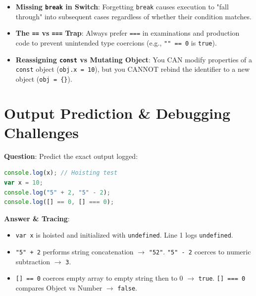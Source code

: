 \begin{examtip}
\begin{itemize}[leftmargin=1.5em]
    \item \textbf{Missing \texttt{break} in Switch}: Forgetting \texttt{break} causes execution to "fall through" into subsequent cases regardless of whether their condition matches.
    \item \textbf{The \texttt{==} vs \texttt{===} Trap}: Always prefer \texttt{===} in examinations and production code to prevent unintended type coercions (e.g., \texttt{"" == 0} is \texttt{true}).
    \item \textbf{Reassigning \texttt{const} vs Mutating Object}: You CAN modify properties of a \texttt{const} object (\texttt{obj.x = 10}), but you CANNOT rebind the identifier to a new object (\texttt{obj = \{\}}).
\end{itemize}
\end{examtip}

\section{Output Prediction \& Debugging Challenges}

\begin{outputprediction}
\textbf{Question}: Predict the exact output logged:
\begin{lstlisting}[language=JavaScript]
console.log(x); // Hoisting test
var x = 10;
console.log("5" + 2, "5" - 2);
console.log([] == 0, [] === 0);
\end{lstlisting}
\textbf{Answer \& Tracing}:
\begin{itemize}
    \item \texttt{var x} is hoisted and initialized with \texttt{undefined}. Line 1 logs \texttt{undefined}.
    \item \texttt{"5" + 2} performs string concatenation $\to$ \texttt{"52"}. \texttt{"5" - 2} coerces to numeric subtraction $\to$ \texttt{3}.
    \item \texttt{[] == 0} coerces empty array to empty string then to 0 $\to$ \texttt{true}. \texttt{[] === 0} compares Object vs Number $\to$ \texttt{false}.
\end{itemize}
\end{outputprediction}

